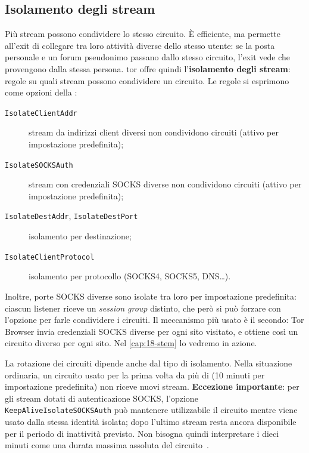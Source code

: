\subsection{Isolamento degli stream}\label{sec:torrc-isolamento}

Più stream possono condividere lo stesso circuito. È efficiente, ma permette all'exit di collegare tra loro attività diverse dello stesso utente: se la posta personale e un forum pseudonimo passano dallo stesso circuito, l'exit vede che provengono dalla stessa persona. tor offre quindi l'\textbf{isolamento degli stream}: regole su quali stream possono condividere un circuito. Le regole si esprimono come opzioni della :
\begin{description}
  \item[\texttt{IsolateClientAddr}] stream da indirizzi client diversi non condividono circuiti (attivo per impostazione predefinita);
  \item[\texttt{IsolateSOCKSAuth}] stream con credenziali SOCKS diverse non condividono circuiti (attivo per impostazione predefinita);
  \item[\texttt{IsolateDestAddr}, \texttt{IsolateDestPort}] isolamento per destinazione;
  \item[\texttt{IsolateClientProtocol}] isolamento per protocollo (SOCKS4, SOCKS5, DNS\ldots).
\end{description}
Inoltre, porte SOCKS diverse sono isolate tra loro per impostazione predefinita: ciascun listener riceve un \emph{session group} distinto, che però si può forzare con l'opzione  per farle condividere i circuiti. Il meccanismo più usato è il secondo: Tor Browser invia credenziali SOCKS diverse per ogni sito visitato, e ottiene così un circuito diverso per ogni sito. Nel \cref{cap:18-stem} lo vedremo in azione.

La rotazione dei circuiti dipende anche dal tipo di isolamento. Nella situazione ordinaria, un circuito usato per la prima volta da più di  (10 minuti per impostazione predefinita) non riceve nuovi stream. \textbf{Eccezione importante}: per gli stream dotati di autenticazione SOCKS, l'opzione \texttt{KeepAliveIsolateSOCKSAuth} può mantenere utilizzabile il circuito mentre viene usato dalla stessa identità isolata; dopo l'ultimo stream resta ancora disponibile per il periodo di inattività previsto. Non bisogna quindi interpretare i dieci minuti come una durata massima assoluta del circuito~.

